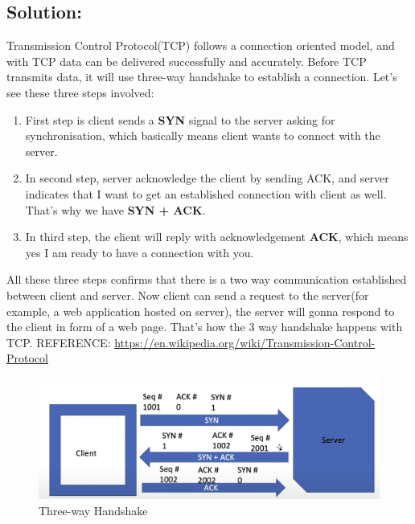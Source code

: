 \documentclass{resources/WeSTassignment}
\begin{document}
\subsection{Solution:}
\begin{flushleft}
Transmission Control Protocol(TCP) follows a connection oriented model, and with TCP data can be delivered successfully and accurately. Before TCP transmits data, it will use three-way handshake to establish a connection. Let’s see these three steps involved:
\end{flushleft} 
\begin{enumerate}
    \item First step is client sends a \textbf{SYN} signal to the server asking for synchronisation, which basically means client wants to connect with the server.
    \item In second step, server acknowledge the client by sending ACK, and server indicates that I want to get an established connection with client as well. That’s why we have \textbf{SYN + ACK}.
    \item In third step, the client will reply with acknowledgement \textbf{ACK}, which means yes I am ready to have a connection with you.\\ 
\end{enumerate}
\begin{flushleft}
    All these three steps confirms that there is a two way communication established between client and server. Now client can send a request to the server(for example, a web application hosted on server), the server will gonna respond to the client in form of a web page. That’s how the 3 way handshake happens with TCP. \bigbreak   REFERENCE: \href{https://en.wikipedia.org/wiki/Transmission_Control_Protocol}{https://en.wikipedia.org/wiki/Transmission-Control-Protocol}
\end{flushleft} 
\begin{figure}[h!]
  \includegraphics[width=\linewidth]{resources/three-way-handshake.png}
  \caption{Three-way Handshake}
  \label{fig:three-way handshake}
\end{figure}
\end{document}
